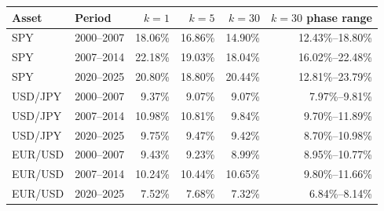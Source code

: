 \begin{tabular}{llrrrr}
\toprule
Asset & Period & $k=1$ & $k=5$ & $k=30$ & $k=30$ phase range \\
\midrule
SPY & 2000–2007 & 18.06\% & 16.86\% & 14.90\% & 12.43\%--18.80\% \\
SPY & 2007–2014 & 22.18\% & 19.03\% & 18.04\% & 16.02\%--22.48\% \\
SPY & 2020–2025 & 20.80\% & 18.80\% & 20.44\% & 12.81\%--23.79\% \\
USD/JPY & 2000–2007 & 9.37\% & 9.07\% & 9.07\% & 7.97\%--9.81\% \\
USD/JPY & 2007–2014 & 10.98\% & 10.81\% & 9.84\% & 9.70\%--11.89\% \\
USD/JPY & 2020–2025 & 9.75\% & 9.47\% & 9.42\% & 8.70\%--10.98\% \\
EUR/USD & 2000–2007 & 9.43\% & 9.23\% & 8.99\% & 8.95\%--10.77\% \\
EUR/USD & 2007–2014 & 10.24\% & 10.44\% & 10.65\% & 9.80\%--11.66\% \\
EUR/USD & 2020–2025 & 7.52\% & 7.68\% & 7.32\% & 6.84\%--8.14\% \\
\bottomrule
\end{tabular}
